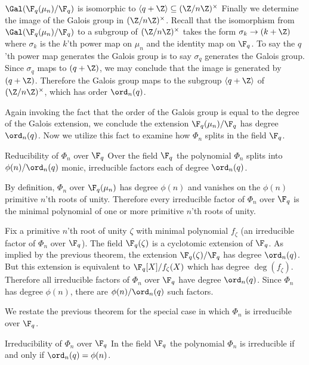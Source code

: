 \begin{theorem}{$\Gal(\F_q(\mu_n)/\F_q)$ is isomorphic to $\langle q+\Z\rangle\subseteq(\Z/n\Z)^\times$}
    Finally we determine the image of the Galois group in $(\Z/n\Z)^\times$.
    Recall that the isomorphism from $\Gal(\F_q(\mu_n)/\F_q)$ to a subgroup of $(\Z/n\Z)^\times$ takes the form $\sigma_k\to(k+\Z)$ where $\sigma_k$ is the $k$'th power map on $\mu_n$ and the identity map on $\F_q$.
    To say the $q$'th power map generates the Galois group is to say $\sigma_q$ generates the Galois group.
    Since $\sigma_q$ maps to $(q+\Z)$, we may conclude that the image is generated by $(q+\Z)$.
    Therefore the Galois group maps to the subgroup $\langle q+\Z\rangle$ of $(\Z/n\Z)^\times$, which has order $\ord_n(q)$.
\end{theorem}

Again invoking the fact that the order of the Galois group is equal to the degree of the Galois extension, we conclude the extension $\F_q(\mu_n)/\F_q$ has degree $\ord_n(q)$.
Now we utilize this fact to examine how $\Phi_n$ splits in the field $\F_q$.

\begin{theorem}{Reducibility of $\Phi_n$ over $\F_q$}
    Over the field $\F_q$ the polynomial $\Phi_n$ splits into $\phi(n)/\ord_n(q)$ monic, irreducible factors each of degree $\ord_n(q)$.

    \proof
    By definition, $\Phi_n$ over $\F_q(\mu_n)$ has degree $\phi(n)$ and vanishes on the $\phi(n)$ primitive $n$'th roots of unity.
    Therefore every irreducible factor of $\Phi_n$ over $\F_q$ is the minimal polynomial of one or more primitive $n$'th roots of unity.

    Fix a primitive $n$'th root of unity $\zeta$ with minimal polynomial $f_\zeta$ (an irreducible factor of $\Phi_n$ over $\F_q$).
    The field $\F_q(\zeta)$ is a cyclotomic extension of $\F_q$.
    As implied by the previous theorem, the extension $\F_q(\zeta)/\F_q$ has degree $\ord_n(q)$.
    But this extension is equivalent to $\F_q[X]/f_\zeta(X)$ which has degree $\deg(f_\zeta)$.
    Therefore all irreducible factors of $\Phi_n$ over $\F_q$ have degree $\ord_n(q)$.
    Since $\Phi_n$ has degree $\phi(n)$, there are $\phi(n)/\ord_n(q)$ such factors.
\end{theorem}

We restate the previous theorem for the special case in which $\Phi_n$ is irreducible over $\F_q$.

\begin{corollary}{Irreducibility of $\Phi_n$ over $\F_q$}
    In the field $\F_q$ the polynomial $\Phi_n$ is irreducible if and only if $\ord_n(q)=\phi(n)$.
\end{corollary}


